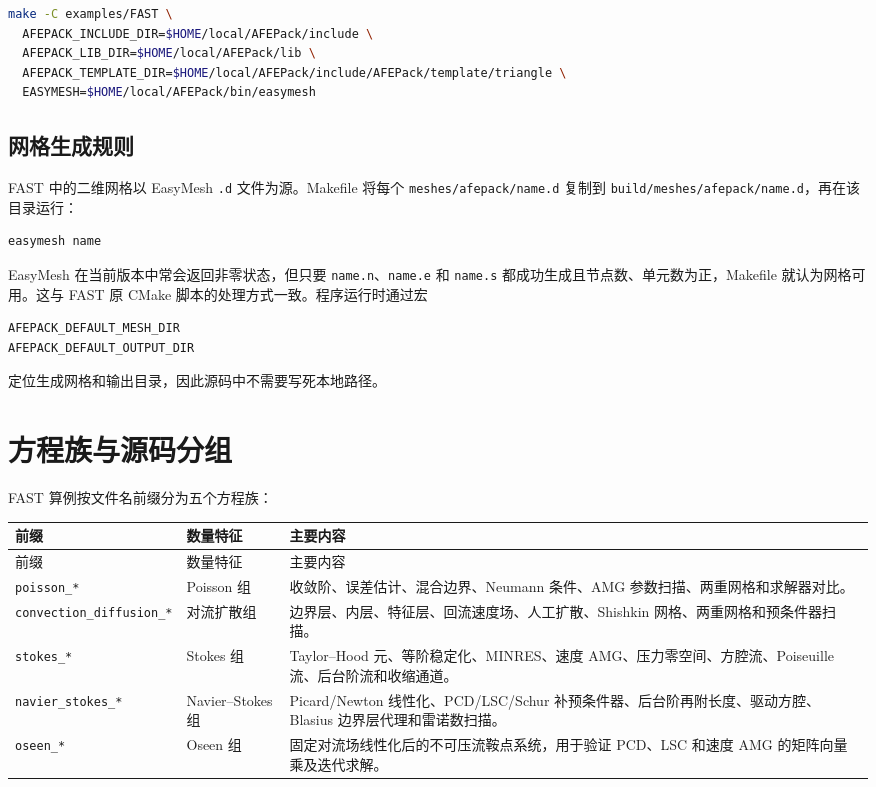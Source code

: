 \documentclass[UTF8,openany,zihao=-4,scheme=chinese]{ctexbook}
\newcommand{\file}[1]{\nolinkurl{#1}}
\begin{document}
\begin{lstlisting}[language=bash]
make -C examples/FAST \
  AFEPACK_INCLUDE_DIR=$HOME/local/AFEPack/include \
  AFEPACK_LIB_DIR=$HOME/local/AFEPack/lib \
  AFEPACK_TEMPLATE_DIR=$HOME/local/AFEPack/include/AFEPack/template/triangle \
  EASYMESH=$HOME/local/AFEPack/bin/easymesh
\end{lstlisting}

\subsection{网格生成规则}

FAST 中的二维网格以 EasyMesh \file{.d} 文件为源。Makefile 将每个 \file{meshes/afepack/name.d} 复制到 \file{build/meshes/afepack/name.d}，再在该目录运行：

\begin{lstlisting}[language=bash]
easymesh name
\end{lstlisting}

EasyMesh 在当前版本中常会返回非零状态，但只要 \file{name.n}、\file{name.e} 和 \file{name.s} 都成功生成且节点数、单元数为正，Makefile 就认为网格可用。这与 FAST 原 CMake 脚本的处理方式一致。程序运行时通过宏

\begin{lstlisting}[language=C++]
AFEPACK_DEFAULT_MESH_DIR
AFEPACK_DEFAULT_OUTPUT_DIR
\end{lstlisting}

定位生成网格和输出目录，因此源码中不需要写死本地路径。

\section{方程族与源码分组}

FAST 算例按文件名前缀分为五个方程族：

\begin{longtable}{p{}p{}p{}}
\toprule
前缀 & 数量特征 & 主要内容\\
\midrule
\endfirsthead
\toprule
前缀 & 数量特征 & 主要内容\\
\midrule
\endhead
\file{poisson\_*} & Poisson 组 & 收敛阶、误差估计、混合边界、Neumann 条件、AMG 参数扫描、两重网格和求解器对比。\\
\file{convection\_diffusion\_*} & 对流扩散组 & 边界层、内层、特征层、回流速度场、人工扩散、Shishkin 网格、两重网格和预条件器扫描。\\
\file{stokes\_*} & Stokes 组 & Taylor--Hood 元、等阶稳定化、MINRES、速度 AMG、压力零空间、方腔流、Poiseuille 流、后台阶流和收缩通道。\\
\file{navier\_stokes\_*} & Navier--Stokes 组 & Picard/Newton 线性化、PCD/LSC/Schur 补预条件器、后台阶再附长度、驱动方腔、Blasius 边界层代理和雷诺数扫描。\\
\file{oseen\_*} & Oseen 组 & 固定对流场线性化后的不可压流鞍点系统，用于验证 PCD、LSC 和速度 AMG 的矩阵向量乘及迭代求解。\\
\bottomrule
\end{longtable}
\end{document}
